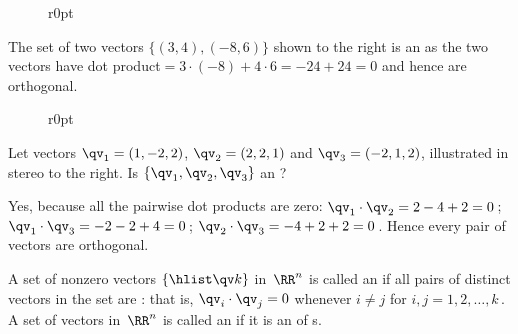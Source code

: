 \begin{wrapfigure}r{0pt} 
\end{wrapfigure}
\begin{example} \label{eg:orthogduo}
The set of two vectors \(\{(3,4),(-8,6)\}\) shown to the right
is an  as the two vectors have dot product\({}=3\cdot(-8)+4\cdot6=-24+24=0\) and hence are orthogonal.
\end{example}

\begin{wrapfigure}r{0pt}
\end{wrapfigure}
\begin{example} \label{eg:orthogtrio}
Let vectors \(\qv_1=(1,-2,2)\), \(\qv_2=(2,2,1)\) and \(\qv_3=(-2,1,2)\), illustrated in stereo to the right. 
Is \(\{\qv_1,\qv_2,\qv_3\}\) an ?

\begin{solution} 
Yes, because all the pairwise dot products are zero: \(\qv_1\cdot\qv_2=2-4+2=0\)\,; \(\qv_1\cdot\qv_3=-2-2+4=0\)\,; \(\qv_2\cdot\qv_3=-4+2+2=0\)\,. 
Hence every pair of vectors are orthogonal. 
\aqed

\end{solution}
\end{example}



\begin{definition} \label{def:orthoset} 
A set of nonzero vectors \(\{\hlist\qv k\}\) in~\(\RR^n\) is called an  if all pairs of distinct vectors in the set are : that is, \(\qv_i\cdot\qv_j=0\) whenever \(i\neq j\) for \(i,j=1,2,\ldots,k\)\,.
A set of vectors in~\(\RR^n\) is called an  if it is an  of s.
\end{definition}

